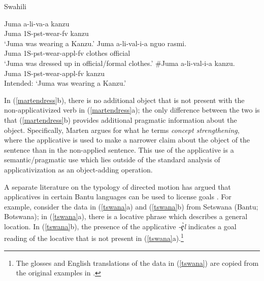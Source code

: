 \documentclass[output=paper]{langsci/langscibook}
\begin{document}
\begin{exe}
\ex\label{martendress}Swahili \begin{xlist}
	\ex \gll Juma a-li-va-a kanzu\\
Juma 1S-{\sc pst}-wear-{\sc fv} kanzu\\
	\glt `Juma was wearing a Kanzu.'
	\ex\gll Juma a-li-val-i-a nguo rasmi.\\
Juma {\sc 1S-pst}-wear-{\sc appl-fv} clothes official\\
	\glt `Juma was dressed up in official/formal clothes.'
	\ex\gll \#Juma a-li-val-i-a kanzu.\\
Juma {\sc 1S-pst}-wear-{\sc appl-fv} kanzu\\
	\glt Intended: `Juma was wearing a Kanzu.' \citep[9]{Marten2003} %
	\end{xlist}
\end{exe}
%
In (\ref{martendress}b), there is no additional object that is not present with the non-applicativized verb in (\ref{martendress}a); the only difference between the two is that (\ref{martendress}b) provides additional pragmatic information about the object. Specifically, Marten argues for what he terms \emph{concept strengthening}, where the applicative is used to make a narrower claim about the object of the sentence than in the non-applied sentence. This use of the applicative is a semantic/pragmatic use which lies outside of the standard analysis of applicativization as an object-adding operation. 

A separate literature on the typology of directed motion has argued that applicatives in certain Bantu languages can be used to license {\sc goals} \citep{schaefer:1985,sitoe:1996}. For example, consider the data in (\ref{tswana}a) and (\ref{tswana}b) from Setswana (Bantu; Botswana); in (\ref{tswana}a), there is a locative phrase which describes a general location. In (\ref{tswana}b), the presence of the applicative \emph{-\c{\`e}l} indicates a {\sc goal}  reading of the locative that is not present in (\ref{tswana}a).\footnote{The glosses and English translations of the data in (\ref{tswana}) are copied from the original examples in \citet{schaefer:1985}.}
\end{document}
